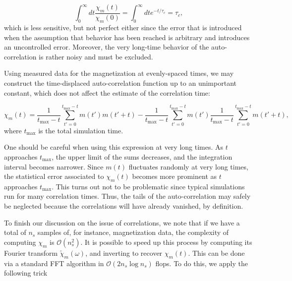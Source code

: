 \begin{equation}
\int_0^\infty dt \frac{\chi_m ( t ) }{\chi_m ( 0 ) } = \int_0^\infty dt e^{-t / \tau_c} = \tau_c  ,
\end{equation}
which is less sensitive, but not perfect either since the error that is introduced when the assumption  that  behavior has been reached is arbitrary and introduces an uncontrolled error.
Moreover, the very long-time behavior of the auto-correlation is rather noisy and must be excluded.

Using measured data for the magnetization at evenly-spaced times, we may construct the time-displaced auto-correlation function up to an unimportant constant, which does not affect the estimate of the correlation time:

\begin{equation}
\chi_m (t) = \frac{1}{ t_{\text{max}} - t } \sum_{t' = 0}^{t_{\text{max}} - t } m (t') m(t' + t) - \frac{1}{ t_{\text{max}} - t } \sum_{t' = 0}^{t_{\text{max}} - t } m (t') \frac{1}{ t_{\text{max}} - t } \sum_{t' = 0}^{t_{\text{max}} - t } m(t' + t) ,
\end{equation}
where $t_{\text{max}}$ is the total simulation time.

One should be careful when using this expression at very long times.
As $t$ approaches $t_{\text{max}}$, the upper limit of the sums decreases, and the integration interval becomes narrower.
Since $m (t)$ fluctuates randomly at very long times, the statistical error associated to $\chi_m (t)$ becomes more prominent as $t$ approaches $t_{\text{max}}$.
This turns out not to be problematic since typical simulations run for many correlation times.
Thus, the tails of the auto-correlation may safely be neglected because the correlations will have already vanished, by definition.

To finish our discussion on the issue of correlations, we note that if we have a total of $n_s$ samples of, for instance, magnetization data, the complexity of computing $\chi_m$ is $\mathcal{O}(n_s^2)$.
It is possible to speed up this process by computing its Fourier transform $\tilde{\chi}_m(\omega)$, and inverting to recover $\chi_m (t)$.
This can be done via a standard \ac{FFT} algorithm in $\mathcal{O}(2 n_s \log n_s )$ flops.
To do this, we apply the following trick

